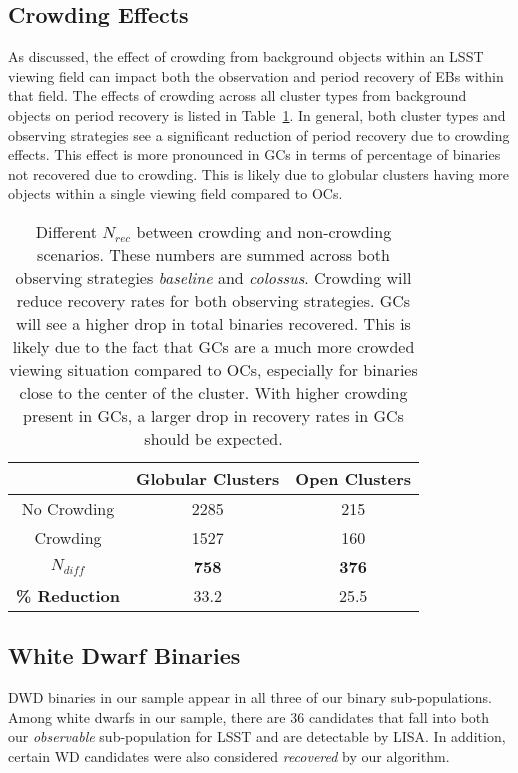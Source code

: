 \documentclass[twocolumn]{aastex63}
\begin{document}
\subsection{Crowding Effects}
\label{subsec:crowding_results}
As discussed, the effect of crowding from background objects within an LSST viewing field can impact both the observation and period recovery of EBs within that field. The effects of crowding across all cluster types from background objects on period recovery is listed in Table~\ref{tab:crowding-table-recovered}. In general, both cluster types and observing strategies see a significant reduction of period recovery due to crowding effects. This effect is more pronounced in GCs in terms of percentage of binaries not recovered due to crowding. This is likely due to globular clusters having more objects within a single viewing field compared to OCs.
\begin{table}[]
    \centering
    \begin{tabular}{c|c|c}
        & \textbf{Globular Clusters} & \textbf{Open Clusters}  \\
        \hline 
        No Crowding & 2285 & 215 \\
        Crowding & 1527 & 160 \\
        \hline 
        $N_{diff}$ & \textbf{758} & \textbf{376} \\
        
        \textbf{\% Reduction} & 33.2 & 25.5

    \end{tabular}
    \caption{Different $N_{rec}$ between crowding and non-crowding scenarios. These numbers are summed across both observing strategies \textit{baseline} and \textit{colossus}. Crowding will reduce recovery rates for both observing strategies. GCs will see a higher drop in total binaries recovered. This is likely due to the fact that GCs are a much more crowded viewing situation compared to OCs, especially for binaries close to the center of the cluster. With higher crowding present in GCs, a larger drop in recovery rates in GCs should be expected.}
    \label{tab:crowding-table-recovered}
\end{table}

\subsection{White Dwarf Binaries}
DWD binaries in our sample appear in all three of our binary sub-populations. Among white dwarfs in our sample, there are 36 candidates that fall into both our \textit{observable} sub-population for LSST and are detectable by LISA. In addition, certain WD candidates were also considered \textit{recovered}  by our algorithm. 
\end{document}
